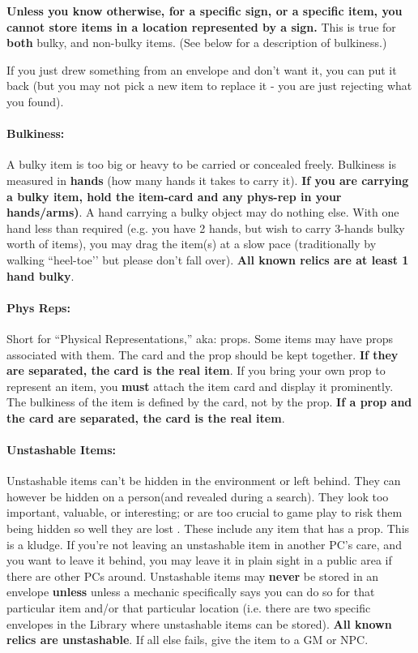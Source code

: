 \documentclass[sheet]{GL2020}
\begin{document}
\textbf{Unless you know otherwise, for a specific sign, or a specific item, you cannot store items in a location represented by a sign.} This is true for \textbf{both} bulky, and non-bulky items. (See below for a description of bulkiness.)

If you just drew something from an envelope and don't want it, you can put it back (but you may not pick a new item to replace it - you are just rejecting what you found).

\paragraph{Bulkiness:} A bulky item is too big or heavy to be carried or concealed freely.  Bulkiness is measured in {\bf hands} (how many hands it takes to carry it).  \textbf{If you are carrying a bulky item, hold the item-card and any phys-rep in your hands/arms)}.  A hand carrying a bulky object may do nothing else.  With one hand less than required (e.g. you have 2 hands, but wish to carry 3-hands bulky worth of items), you may drag the item(s) at a slow pace (traditionally by walking ``heel-toe'’ but please don’t fall over). \textbf{All known relics are at least 1 hand bulky}.

\paragraph{Phys Reps:} Short for ``Physical Representations,'' aka: props. Some items may have props associated with them.  The card and the prop should be kept together. \textbf{If they are separated, the card is the real item}. If you bring your own prop to represent an item, you \textbf{must} attach the item card and display it prominently. The bulkiness of the item is defined by the card, not by the prop. \textbf{If a prop and the card are separated, the card is the real item}.

\paragraph{Unstashable Items:} Unstashable items can't be hidden in the environment or left behind. They can however be hidden on a person(and revealed during a search).  They look too important, valuable, or interesting; or are too crucial to game play to risk them being hidden so well they are lost . These include any item that has a prop. This is a kludge. If you're not leaving an unstashable item in another PC's care, and you want to leave it behind, you may leave it in plain sight in a public area if there are other PCs around. Unstashable items may \textbf{never} be stored in an envelope \textbf{unless} unless a mechanic specifically says you can do so for that particular item and/or that particular location (i.e. there are two specific envelopes in the Library where unstashable items can be stored). \textbf{All known relics are unstashable}. If all else fails, give the item to a GM or NPC.
\end{document}
